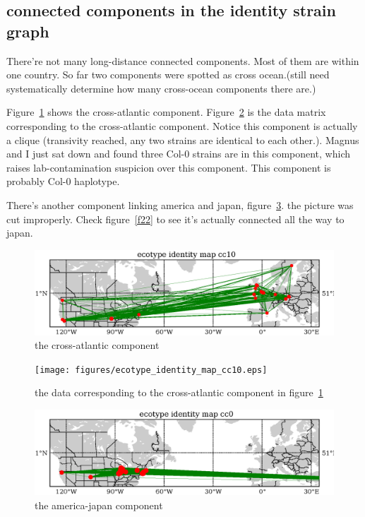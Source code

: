 \documentclass[a4paper,10pt]{article}
\begin{document}
\subsection{connected components in the identity strain graph}
There're not many long-distance connected components. Most of them are within one country. So far two components were spotted as cross ocean.(still need systematically determine how many cross-ocean components there are.)

Figure~\ref{f25} shows the cross-atlantic component. Figure~\ref{f26} is the data matrix corresponding to the cross-atlantic component. Notice this component is actually a clique (transivity reached, any two strains are identical to each other.). Magnus and I just sat down and found three Col-0 strains are in this component, which raises lab-contamination suspicion over this component. This component is probably Col-0 haplotype.

There's another component linking america and japan, figure~\ref{f27}. the picture was cut improperly. Check figure~\ref{f22} to see it's actually connected all the way to japan.

\begin{figure}
\includegraphics[width=1\textwidth]{figures/ecotype_identity_cc10_site_network.eps}
\caption{the cross-atlantic component}\label{f25}
\end{figure}

\begin{figure}
\texttt{[image: figures/ecotype\_identity\_map\_cc10.eps]}
\caption{the data corresponding to the cross-atlantic component in figure~\ref{f25}}\label{f26}
\end{figure}

\begin{figure}
\includegraphics[width=1\textwidth]{figures/ecotype_identity_cc0_site_network.eps}
\caption{the america-japan component}\label{f27}
\end{figure}
\end{document}
